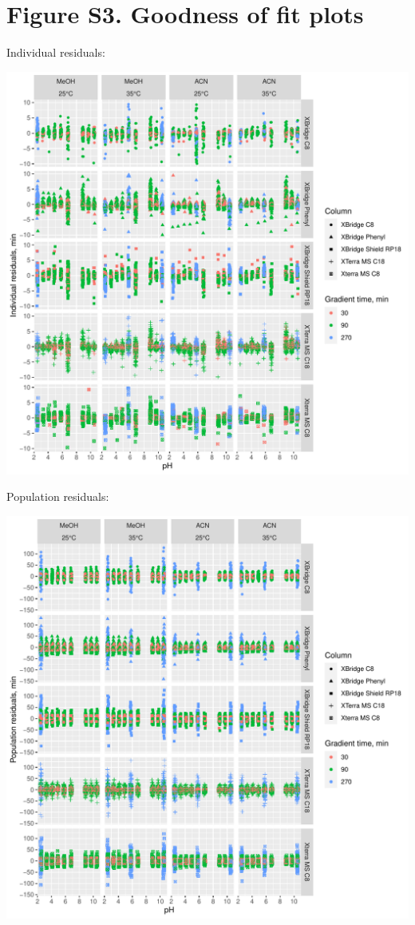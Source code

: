 \documentclass[
]{article}
\begin{document}
\newpage{}

\hypertarget{figure-s3.-goodness-of-fit-plots}{%
\section{Figure S3. Goodness of fit
plots}\label{figure-s3.-goodness-of-fit-plots}}

Individual residuals:

\includegraphics{../figures/concordanceplots/individualresiduals.pdf}

\newpage{}

Population residuals:

\includegraphics{../figures/concordanceplots/populationresiduals.pdf}
\end{document}
